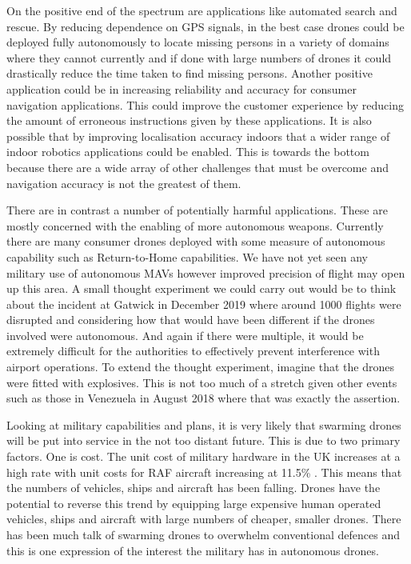 \documentclass[]{../resources/final_report}
\begin{document}
On the positive end of the spectrum are applications like automated search and rescue. By reducing
dependence on GPS signals, in the best case drones could be deployed fully autonomously to locate
missing persons in a variety of domains where they cannot currently and if done with large numbers 
of drones it could drastically reduce the time taken to find missing persons.
Another positive application could be in increasing reliability and accuracy for consumer navigation 
applications. This could improve the customer experience by reducing the amount of erroneous 
instructions given by these applications.
It is also possible that by improving localisation accuracy indoors that a wider range of indoor 
robotics applications could be enabled. This is towards the bottom because there are a wide array 
of other challenges that must be overcome and navigation accuracy is not the greatest of them.

There are in contrast a number of potentially harmful applications. These are mostly concerned with 
the enabling of more autonomous weapons. Currently there are many consumer drones deployed with some 
measure of autonomous capability such as Return-to-Home capabilities. We have not yet seen any military 
use of autonomous MAVs however improved precision of flight may open up this area. A small thought 
experiment we could carry out would be to think about the incident at Gatwick in December 2019 where 
around 1000 flights were disrupted \cite{Gatwick_Airport} and considering how that would have been 
different if the drones involved were autonomous. And again if there were multiple, it would be extremely 
difficult for the authorities to effectively prevent interference with airport operations. To extend 
the thought experiment, imagine that the drones were fitted with explosives. This is not too much of 
a stretch given other events such as those in Venezuela in August 2018 \cite{Caracas_drone} where that was exactly 
the assertion.

Looking at military capabilities and plans, it is very likely that swarming drones will be put into 
service in the not too distant future. This is due to two primary factors. One is cost. The unit cost of 
military hardware in the UK increases at a high rate with unit costs for RAF aircraft increasing at 11.5\% \cite{RUSI_defence_costs}. 
This means that the numbers of vehicles, ships and aircraft has been falling. Drones have the potential to reverse this trend by 
equipping large expensive human operated vehicles, ships and aircraft with large numbers of cheaper, 
smaller drones. There has been much talk of swarming drones to overwhelm conventional defences and this 
is one expression of the interest the military has in autonomous drones\cite{ssss}.
\end{document}
